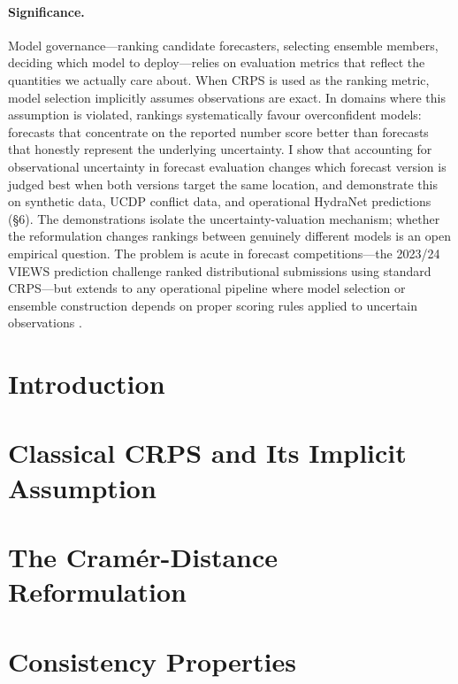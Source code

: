 \documentclass[11pt,a4paper]{article}
\begin{document}
\paragraph{Significance.}
Model governance---ranking candidate forecasters, selecting ensemble members, deciding which model to deploy---relies on evaluation metrics that reflect the quantities we actually care about. When CRPS is used as the ranking metric, model selection implicitly assumes observations are exact. In domains where this assumption is violated, rankings systematically favour overconfident models: forecasts that concentrate on the reported number score better than forecasts that honestly represent the underlying uncertainty. I show that accounting for observational uncertainty in forecast evaluation changes which forecast version is judged best when both versions target the same location, and demonstrate this on synthetic data, UCDP conflict data, and operational HydraNet predictions (\S6). The demonstrations isolate the uncertainty-valuation mechanism; whether the reformulation changes rankings between genuinely different models is an open empirical question. The problem is acute in forecast competitions---the 2023/24 VIEWS prediction challenge \citep{hegre2025prediction} ranked distributional submissions using standard CRPS---but extends to any operational pipeline where model selection or ensemble construction depends on proper scoring rules applied to uncertain observations \citep{bessac2021forecast}.

\section{Introduction}


\section{Classical CRPS and Its Implicit Assumption}


\section{The Cram\'er-Distance Reformulation}


\section{Consistency Properties}

\end{document}
